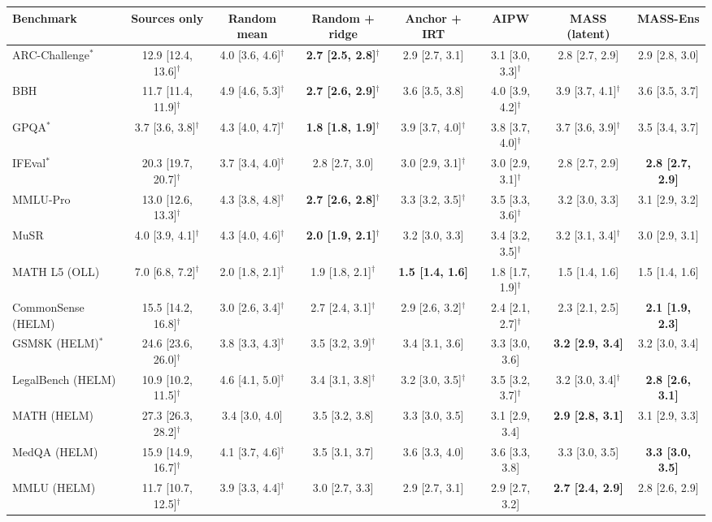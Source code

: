 \begin{tabular}{lccccccc}
\toprule
Benchmark & Sources only & Random mean & Random + ridge & Anchor + IRT & AIPW & MASS (latent) & MASS-Ens \\
\midrule
ARC-Challenge$^*$ & 12.9 [12.4, 13.6]$^\dagger$ & 4.0 [3.6, 4.6]$^\dagger$ & \textbf{2.7 [2.5, 2.8]$^\dagger$} & 2.9 [2.7, 3.1] & 3.1 [3.0, 3.3]$^\dagger$ & 2.8 [2.7, 2.9] & 2.9 [2.8, 3.0] \\
BBH & 11.7 [11.4, 11.9]$^\dagger$ & 4.9 [4.6, 5.3]$^\dagger$ & \textbf{2.7 [2.6, 2.9]$^\dagger$} & 3.6 [3.5, 3.8] & 4.0 [3.9, 4.2]$^\dagger$ & 3.9 [3.7, 4.1]$^\dagger$ & 3.6 [3.5, 3.7] \\
GPQA$^*$ & 3.7 [3.6, 3.8]$^\dagger$ & 4.3 [4.0, 4.7]$^\dagger$ & \textbf{1.8 [1.8, 1.9]$^\dagger$} & 3.9 [3.7, 4.0]$^\dagger$ & 3.8 [3.7, 4.0]$^\dagger$ & 3.7 [3.6, 3.9]$^\dagger$ & 3.5 [3.4, 3.7] \\
IFEval$^*$ & 20.3 [19.7, 20.7]$^\dagger$ & 3.7 [3.4, 4.0]$^\dagger$ & 2.8 [2.7, 3.0] & 3.0 [2.9, 3.1]$^\dagger$ & 3.0 [2.9, 3.1]$^\dagger$ & 2.8 [2.7, 2.9] & \textbf{2.8 [2.7, 2.9]} \\
MMLU-Pro & 13.0 [12.6, 13.3]$^\dagger$ & 4.3 [3.8, 4.8]$^\dagger$ & \textbf{2.7 [2.6, 2.8]$^\dagger$} & 3.3 [3.2, 3.5]$^\dagger$ & 3.5 [3.3, 3.6]$^\dagger$ & 3.2 [3.0, 3.3] & 3.1 [2.9, 3.2] \\
MuSR & 4.0 [3.9, 4.1]$^\dagger$ & 4.3 [4.0, 4.6]$^\dagger$ & \textbf{2.0 [1.9, 2.1]$^\dagger$} & 3.2 [3.0, 3.3] & 3.4 [3.2, 3.5]$^\dagger$ & 3.2 [3.1, 3.4]$^\dagger$ & 3.0 [2.9, 3.1] \\
MATH L5 (OLL) & 7.0 [6.8, 7.2]$^\dagger$ & 2.0 [1.8, 2.1]$^\dagger$ & 1.9 [1.8, 2.1]$^\dagger$ & \textbf{1.5 [1.4, 1.6]} & 1.8 [1.7, 1.9]$^\dagger$ & 1.5 [1.4, 1.6] & 1.5 [1.4, 1.6] \\
CommonSense (HELM) & 15.5 [14.2, 16.8]$^\dagger$ & 3.0 [2.6, 3.4]$^\dagger$ & 2.7 [2.4, 3.1]$^\dagger$ & 2.9 [2.6, 3.2]$^\dagger$ & 2.4 [2.1, 2.7]$^\dagger$ & 2.3 [2.1, 2.5] & \textbf{2.1 [1.9, 2.3]} \\
GSM8K (HELM)$^*$ & 24.6 [23.6, 26.0]$^\dagger$ & 3.8 [3.3, 4.3]$^\dagger$ & 3.5 [3.2, 3.9]$^\dagger$ & 3.4 [3.1, 3.6] & 3.3 [3.0, 3.6] & \textbf{3.2 [2.9, 3.4]} & 3.2 [3.0, 3.4] \\
LegalBench (HELM) & 10.9 [10.2, 11.5]$^\dagger$ & 4.6 [4.1, 5.0]$^\dagger$ & 3.4 [3.1, 3.8]$^\dagger$ & 3.2 [3.0, 3.5]$^\dagger$ & 3.5 [3.2, 3.7]$^\dagger$ & 3.2 [3.0, 3.4]$^\dagger$ & \textbf{2.8 [2.6, 3.1]} \\
MATH (HELM) & 27.3 [26.3, 28.2]$^\dagger$ & 3.4 [3.0, 4.0] & 3.5 [3.2, 3.8] & 3.3 [3.0, 3.5] & 3.1 [2.9, 3.4] & \textbf{2.9 [2.8, 3.1]} & 3.1 [2.9, 3.3] \\
MedQA (HELM) & 15.9 [14.9, 16.7]$^\dagger$ & 4.1 [3.7, 4.6]$^\dagger$ & 3.5 [3.1, 3.7] & 3.6 [3.3, 4.0] & 3.6 [3.3, 3.8] & 3.3 [3.0, 3.5] & \textbf{3.3 [3.0, 3.5]} \\
MMLU (HELM) & 11.7 [10.7, 12.5]$^\dagger$ & 3.9 [3.3, 4.4]$^\dagger$ & 3.0 [2.7, 3.3] & 2.9 [2.7, 3.1] & 2.9 [2.7, 3.2] & \textbf{2.7 [2.4, 2.9]} & 2.8 [2.6, 2.9] \\
\bottomrule
\end{tabular}
